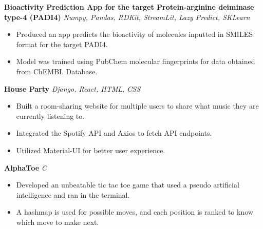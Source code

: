 \documentclass[a4paper]{article}
\begin{document}
{\textbf{Bioactivity Prediction App for the target Protein-arginine deiminase type-4 (PADI4)}} {\sl Numpy, Pandas, RDKit, StreamLit, Lazy Predict, SKLearn} \\
\vspace{-1mm}
\begin{itemize} \itemsep 1pt
	\item Produced an app predicts the bioactivity of molecules inputted in SMILES format for the target PADI4.
	\item Model was trained using PubChem molecular fingerprints for data obtained from ChEMBL Database.
\end{itemize}
\vspace*{1mm}

{\textbf{House Party}} {\sl Django, React, HTML, CSS} \\
\vspace{-1mm}
\begin{itemize} \itemsep 1pt
	\item Built a room-sharing website for multiple users to share what music they are currently listening to.
	\item Integrated the Spotify API and Axios to fetch API endpoints.
        \item Utilized Material-UI for better user experience.\\
\end{itemize}
\vspace*{1mm}

{\textbf{AlphaToe}} {\sl C}\\
\vspace{-1mm}
\begin{itemize} \itemsep 1pt
	\item Developed an unbeatable tic tac toe game that used a pseudo artificial intelligence and ran in the terminal.
	\item A hashmap is used for possible moves, and each position is ranked to know which move to make next.\\
\end{itemize}
\vspace*{1mm}
\end{document}
